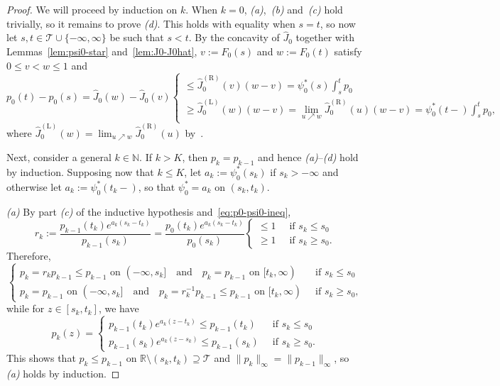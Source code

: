 \documentclass[a4paper]{article}
\newcommand{\N}{\mathbb{N}}
\newcommand{\R}{\mathbb{R}}
\newcommand{\norm}[1]{\|{#1}\|}
\theoremstyle{definition}
\begin{document}
\begin{proof}
We will proceed by induction on $k$. When $k = 0$, \textit{(a)},~\textit{(b)} and~\textit{(c)} hold trivially, so it remains to prove \textit{(d)}. This holds with equality when $s = t$, so now let $s,t \in \mathcal{T} \cup \{-\infty,\infty\}$ be such that $s < t$. By the concavity of $\hat{J}_0$ together with Lemmas~\ref{lem:psi0-star} and~\ref{lem:J0-J0hat}, $v := F_0(s)$ and $w := F_0(t)$ satisfy $0 \leq v < w \leq 1$ and
\begin{equation}
\label{eq:p0-F0-ineq-1}
p_0(t) - p_0(s) = \hat{J}_0(w)  - \hat{J}_0(v) 
\begin{cases}
\leq \hat{J}_0^{(\mathrm{R})}(v)(w - v) = \psi_0^*(s)\int_s^t p_0 \\[3pt]
\geq \hat{J}_0^{(\mathrm{L})}(w)(w - v) = \displaystyle\lim_{u \nearrow w}\hat{J}_0^{(\mathrm{R})}(u)(w - v) = \textstyle\psi_0^*(t-)\int_s^t p_0,
\end{cases}
\end{equation}
where $\hat{J}_0^{(\mathrm{L})}(w) = \lim_{u \nearrow w}\hat{J}_0^{(\mathrm{R})}(u)$ by~\citet[Theorem~24.1]{rockafellar97convex}. 

Next, consider a general $k \in \N$. If $k > K$, then $p_k = p_{k-1}$ and hence \textit{(a)}--\textit{(d)} hold by induction. Supposing now that $k \leq K$, let $a_k := \psi_0^*(s_k)$ if $s_k > -\infty$ and otherwise let $a_k := \psi_0^*(t_k-)$, so that $\psi_0^* = a_k$ on $(s_k,t_k)$.

\medskip
\noindent
\textit{(a)} By part \textit{(c)} of the inductive hypothesis and~\eqref{eq:p0-psi0-ineq},
\begin{equation}
\label{eq:rk}
r_k := \frac{p_{k-1}(t_k)e^{a_k(s_k - t_k)}}{p_{k-1}(s_k)} = \frac{p_0(t_k)e^{a_k(s_k - t_k)}}{p_0(s_k)}
\begin{cases}
\leq 1 \;\;&\text{if }s_k \leq s_0 \\
\geq 1 \;\;&\text{if }s_k \geq s_0.
\end{cases}
\end{equation}
Therefore,
\begin{equation}
\label{eq:pk-pk-1}
\begin{cases}
p_k = r_k p_{k-1} \leq p_{k-1} \text{ on }(-\infty,s_k] \quad\text{and}\quad p_k = p_{k-1} \text{ on }[t_k,\infty) \;\;&\text{if }s_k \leq s_0 \\
p_k = p_{k-1} \text{ on }(-\infty,s_k] \quad\text{and}\quad p_k = r_k^{-1}p_{k-1} \leq p_{k-1} \text{ on }[t_k,\infty) \;\;&\text{if }s_k \geq s_0,
\end{cases}
\end{equation}
while for $z \in [s_k,t_k]$, we have
\[
p_k(z) = 
\begin{cases}
p_{k-1}(t_k)e^{a_k(z - t_k)} \leq p_{k-1}(t_k) \;\;&\text{if }s_k \leq s_0 \\
p_{k-1}(s_k)e^{a_k(z - s_k)} \leq p_{k-1}(s_k) \;\;&\text{if }s_k \geq s_0.
\end{cases}
\]
This shows that $p_k \leq p_{k-1}$ on $\R \setminus (s_k,t_k) \supseteq \mathcal{T}$ and $\norm{p_k}_\infty = \norm{p_{k-1}}_\infty$, so \textit{(a)} holds by induction.


\end{proof}
\end{document}
